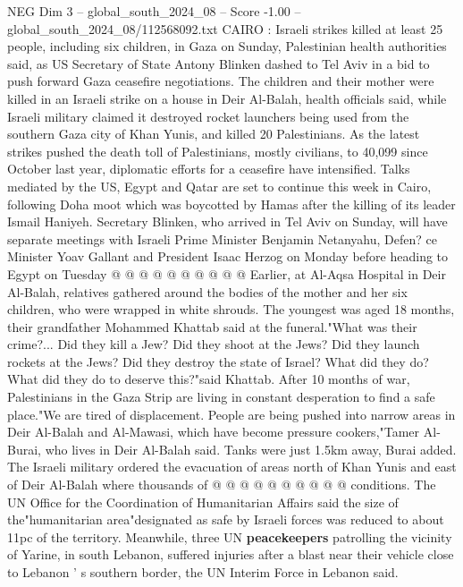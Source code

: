 \begin{textsample}{NEG Dim 3 – global\_south\_2024\_08 – Score -1.00 – global\_south\_2024\_08/112568092.txt}  \label{ex:f3_neg_122}
CAIRO : Israeli strikes killed at least 25 people, including six children, in Gaza on Sunday, Palestinian health authorities said, as US Secretary of State Antony Blinken dashed to Tel Aviv in a bid to push forward Gaza ceasefire negotiations.
The children and their mother were killed in an Israeli strike on a house in Deir Al-Balah, health officials said, while Israeli military claimed it destroyed rocket launchers being used from the southern Gaza city of Khan Yunis, and killed 20 Palestinians.
As the latest strikes pushed the death toll of Palestinians, mostly civilians, to 40,099 since October last year, diplomatic efforts for a ceasefire have intensified.
Talks mediated by the US, Egypt and Qatar are set to continue this week in Cairo, following Doha moot which was boycotted by Hamas after the killing of its leader Ismail Haniyeh.
Secretary Blinken, who arrived in Tel Aviv on Sunday, will have separate meetings with Israeli Prime Minister Benjamin Netanyahu, Defen? ce Minister Yoav Gallant and President Isaac Herzog on Monday before heading to Egypt on Tuesday @ @ @ @ @ @ @ @ @ @ Earlier, at Al-Aqsa Hospital in Deir Al-Balah, relatives gathered around the bodies of the mother and her six children, who were wrapped in white shrouds.
The youngest was aged 18 months, their grandfather Mohammed Khattab said at the funeral."What was their crime?...
Did they kill a Jew?
Did they shoot at the Jews?
Did they launch rockets at the Jews?
Did they destroy the state of Israel?
What did they do?
What did they do to deserve this?"said Khattab.
After 10 months of war, Palestinians in the Gaza Strip are living in constant desperation to find a safe place."We are tired of displacement.
People are being pushed into narrow areas in Deir Al-Balah and Al-Mawasi, which have become pressure cookers,"Tamer Al-Burai, who lives in Deir Al-Balah said.
Tanks were just 1.5km away, Burai added.
The Israeli military ordered the evacuation of areas north of Khan Yunis and east of Deir Al-Balah where thousands of @ @ @ @ @ @ @ @ @ @ conditions.
The UN Office for the Coordination of Humanitarian Affairs said the size of the"humanitarian area"designated as safe by Israeli forces was reduced to about 11pc of the territory.
Meanwhile, three UN \textbf{peacekeepers} patrolling the vicinity of Yarine, in south Lebanon, suffered injuries after a blast near their vehicle close to Lebanon ' s southern border, the UN Interim Force in Lebanon said.

\end{textsample}
